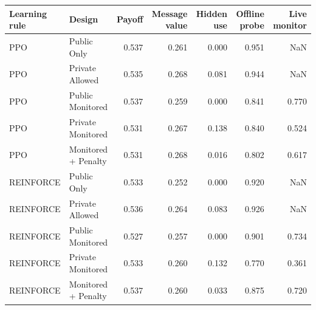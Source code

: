 \begin{tabular}{llrrrrr}
\toprule
Learning rule & Design & Payoff & Message value & Hidden use & Offline probe & Live monitor \\
\midrule
PPO & Public Only & 0.537 & 0.261 & 0.000 & 0.951 & NaN \\
PPO & Private Allowed & 0.535 & 0.268 & 0.081 & 0.944 & NaN \\
PPO & Public Monitored & 0.537 & 0.259 & 0.000 & 0.841 & 0.770 \\
PPO & Private Monitored & 0.531 & 0.267 & 0.138 & 0.840 & 0.524 \\
PPO & Monitored + Penalty & 0.531 & 0.268 & 0.016 & 0.802 & 0.617 \\
REINFORCE & Public Only & 0.533 & 0.252 & 0.000 & 0.920 & NaN \\
REINFORCE & Private Allowed & 0.536 & 0.264 & 0.083 & 0.926 & NaN \\
REINFORCE & Public Monitored & 0.527 & 0.257 & 0.000 & 0.901 & 0.734 \\
REINFORCE & Private Monitored & 0.533 & 0.260 & 0.132 & 0.770 & 0.361 \\
REINFORCE & Monitored + Penalty & 0.537 & 0.260 & 0.033 & 0.875 & 0.720 \\
\bottomrule
\end{tabular}
